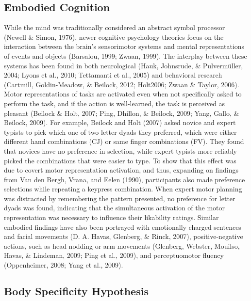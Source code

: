 \documentclass[english,man]{apa6}
\theoremstyle{definition}
\theoremstyle{definition}
\theoremstyle{definition}
\theoremstyle{remark}
\begin{document}
\subsection{Embodied Cognition}\label{embodied-cognition}

While the mind was traditionally considered an abstract symbol processor
(Newell \& Simon, 1976), newer cognitive psychology theories focus on
the interaction between the brain's sensorimotor systems and mental
representations of events and objects (Barsalou, 1999; Zwaan, 1999). The
interplay between these systems has been found in both neurological
(Hauk, Johnsrude, \& Pulvermüller, 2004; Lyons et al., 2010; Tettamanti
et al., 2005) and behavioral research (Cartmill, Goldin-Meadow, \&
Beilock, 2012; Holt2006; Zwaan \& Taylor, 2006). Motor representations
of tasks are activated even when not specifically asked to perform the
task, and if the action is well-learned, the task is perceived as
pleasant (Beilock \& Holt, 2007; Ping, Dhillon, \& Beilock, 2009; Yang,
Gallo, \& Beilock, 2009). For example, Beilock and Holt (2007) asked
novice and expert typists to pick which one of two letter dyads they
preferred, which were either different hand combinations (CJ) or same
finger combinations (FV). They found that novices have no preference in
selection, while expert typists more reliably picked the combinations
that were easier to type. To show that this effect was due to covert
motor representation activation, and thus, expanding on findings from
Van den Bergh, Vrana, and Eelen (1990), participants also made
preference selections while repeating a keypress combination. When
expert motor planning was distracted by remembering the pattern
presented, no preference for letter dyads was found, indicating that the
simultaneous activation of the motor representation was necessary to
influence their likability ratings. Similar embodied findings have also
been portrayed with emotionally charged sentences and facial movements
(D. A. Havas, Glenberg, \& Rinck, 2007), positive-negative actions, such
as head nodding or arm movements (Glenberg, Webster, Mouilso, Havas, \&
Lindeman, 2009; Ping et al., 2009), and perceptuomotor fluency
(Oppenheimer, 2008; Yang et al., 2009).

\subsection{Body Specificity
Hypothesis}\label{body-specificity-hypothesis}
\end{document}
